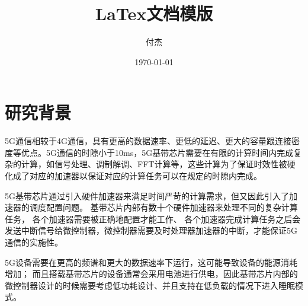 \documentclass[a4paper, 12pt]{article}
\title{LaTex文档模版}
\author{付杰}
\date{\today}
\newif\ifchinese %
\begin{document}



\tableofcontents %
\clearpage





\setcounter{page}{1}
\section{研究背景}%
5G通信相较于4G通信，具有更高的数据速率、更低的延迟、更大的容量跟连接密度等优点。5G通信的时隙小于10ms，5G基带芯片需要在有限的计算时间内完成复杂的计算，如信号处理、调制解调、FFT计算等，这些计算为了保证时效性被硬化成了对应的加速器以保证对应的计算任务可以在规定的时隙内完成\cite{8920308}。

5G基带芯片通过引入硬件加速器来满足时间严苛的计算需求，但又因此引入了加速器的调度配置问题。
基带芯片内部有数十个硬件加速器来处理不同的复杂计算任务，
各个加速器需要被正确地配置才能工作、
各个加速器完成计算任务之后会发送中断信号给微控制器，微控制器需要及时处理器加速器的中断，才能保证5G通信的实施性\cite{9048785}。

5G设备需要在更高的频谱和更大的数据速率下运行，这可能导致设备的能源消耗增加；
而且搭载基带芯片的设备通常会采用电池进行供电，因此基带芯片内部的微控制器设计的时候需要考虑低功耗设计、并且支持在低负载的情况下进入睡眠模式\cite{9336351}。
\end{document}
